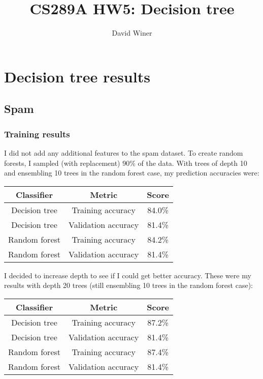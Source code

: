 \documentclass{report}
\begin{document}
\title{\Huge\bf CS289A HW5: Decision tree}
\author{David Winer}
\maketitle

\section*{Decision tree results}
\subsection*{Spam}
\subsubsection*{Training results}
I did not add any additional features to the spam dataset. To create random forests, I sampled (with replacement) 90\% of the data. With trees of depth 10 and ensembling 10 trees in the random forest case, my prediction accuracies were:

\begin{center}
\begin{tabular} {|c | c | c |}
\hline
\textbf{Classifier} & \textbf{Metric} & \textbf{Score} \\
\hline
Decision tree & Training accuracy & 84.0\% \\
\hline
Decision tree & Validation accuracy & 81.4\% \\
\hline
Random forest & Training accuracy & 84.2\% \\
\hline
Random forest & Validation accuracy & 81.4\% \\
\hline
\end{tabular}
\end{center}

I decided to increase depth to see if I could get better accuracy. These were my results with depth 20 trees (still ensembling 10 trees in the random forest case):

\begin{center}
\begin{tabular} {|c | c | c |}
\hline
\textbf{Classifier} & \textbf{Metric} & \textbf{Score} \\
\hline
Decision tree & Training accuracy & 87.2\% \\
\hline
Decision tree & Validation accuracy & 81.4\% \\
\hline
Random forest & Training accuracy & 87.4\% \\
\hline
Random forest & Validation accuracy & 81.4\% \\
\hline
\end{tabular}
\end{center}
\end{document}
